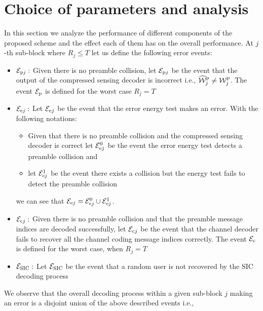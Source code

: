 \section{Choice of parameters and analysis}

In this section we analyze the performance of different components of the proposed scheme and the effect each of them has on the overall performance. At $j$-th sub-block where $R_j\leq T$ let us define the following error events:
\begin{itemize}
\item $\mathcal{E}_{\mathrm{p}j}:$ Given there is no preamble collision, let $\mathcal{E}_{\mathrm{p}j}$ be the event that the output of the compressed sensing decoder is incorrect i.e., $\widehat{\mathcal{W}}_j^{\mathrm{p}}\neq \mathcal{W}_j^{\mathrm{p}}$. The event $\mathcal{E}_{\mathrm{p}}$ is defined for the worst case $R_j=T$
\item $\mathcal{E}_{\mathrm{e}j}:$ Let $\mathcal{E}_{\mathrm{e}j}$ be the event that the error energy test makes an error. With the following notations:
\begin{itemize}
\item  Given that there is no preamble collision and the compressed sensing decoder is correct let $\mathcal{E}_{\mathrm{e}j}^{0}$ be the event the error energy test detects a preamble collision and 
\item let $\mathcal{E}_{\mathrm{e}j}^1$ be the event there exists a collision but the energy test fails to detect the preamble collision 
\end{itemize}
we can see that $\mathcal{E}_{\mathrm{e}j}=\mathcal{E}_{\mathrm{e}j}^0 \cup \mathcal{E}_{\mathrm{e}j}^1$.
\item $ \mathcal{E}_{\mathrm{c}j}:$ Given there is no preamble collision and that the preamble message indices are decoded successfully, let $\mathcal{E}_{\mathrm{c}j}$ be the event that the channel decoder fails to recover all the channel coding message indices correctly. The event $\mathcal{E}_{\mathrm{c}}$ is defined for the worst case, when $R_j=T$
\item $\mathcal{E}_{\text{SIC}}:$ Let $\mathcal{E}_{\text{SIC}}$ be the event that a random user is not recovered by the SIC decoding process
\end{itemize}
We observe that the overall decoding process within a given sub-block $j$ making an error is a disjoint union of the above described events i.e., 
